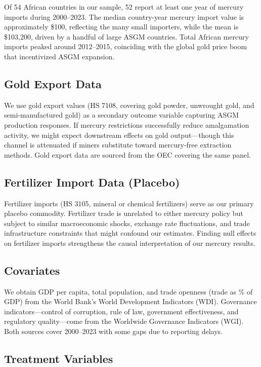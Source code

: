 \documentclass[12pt]{article}
\begin{document}
Of 54 African countries in our sample, 52 report at least one year of mercury imports during 2000--2023. The median country-year mercury import value is approximately \$100, reflecting the many small importers, while the mean is \$103,200, driven by a handful of large ASGM countries. Total African mercury imports peaked around 2012--2015, coinciding with the global gold price boom that incentivized ASGM expansion.

\subsection{Gold Export Data}

We use gold export values (HS 7108, covering gold powder, unwrought gold, and semi-manufactured gold) as a secondary outcome variable capturing ASGM production responses. If mercury restrictions successfully reduce amalgamation activity, we might expect downstream effects on gold output---though this channel is attenuated if miners substitute toward mercury-free extraction methods. Gold export data are sourced from the OEC covering the same panel.

\subsection{Fertilizer Import Data (Placebo)}

Fertilizer imports (HS 3105, mineral or chemical fertilizers) serve as our primary placebo commodity. Fertilizer trade is unrelated to either mercury policy but subject to similar macroeconomic shocks, exchange rate fluctuations, and trade infrastructure constraints that might confound our estimates. Finding null effects on fertilizer imports strengthens the causal interpretation of our mercury results.

\subsection{Covariates}

We obtain GDP per capita, total population, and trade openness (trade as \% of GDP) from the World Bank's World Development Indicators (WDI). Governance indicators---control of corruption, rule of law, government effectiveness, and regulatory quality---come from the Worldwide Governance Indicators (WGI). Both sources cover 2000--2023 with some gaps due to reporting delays.

\subsection{Treatment Variables}
\end{document}
